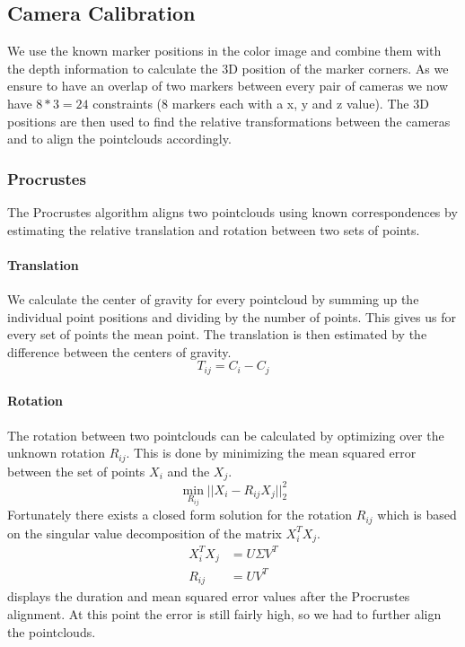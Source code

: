 \documentclass[10pt,twocolumn,letterpaper]{article}
\begin{document}
\subsection{Camera Calibration}
We use the known marker positions in the color image and combine them with the depth information to calculate the 3D position of the marker corners. As we ensure to have an overlap of two markers between every pair of cameras we now have $8*3=24$ constraints (8 markers each with a x, y and z value). The 3D positions are then used to find the relative transformations between the cameras and to align the pointclouds accordingly.
%
\subsubsection{Procrustes}
The Procrustes algorithm aligns two pointclouds using known correspondences by estimating the relative translation and rotation between two sets of points.
\paragraph{Translation}
We calculate the center of gravity for every pointcloud by summing up the individual point positions and dividing by the number of points. This gives us for every set of points the mean point. The translation is then estimated by the difference between the centers of gravity.
\begin{equation}
	T_{ij} = C_i - C_j
\end{equation}
\paragraph{Rotation}
The rotation between two pointclouds can be calculated by optimizing over the unknown rotation $R_{ij}$. This is done by minimizing the mean squared error between the set of points $X_i$ and the $X_j$.
\begin{equation}
	\min_{R_{ij}} || X_i - R_{ij} X_j ||^2_2
\end{equation}
Fortunately there exists a closed form solution for the rotation $R_{ij}$ which is based on the singular value decomposition of the matrix $X_i^T X_j$.
\begin{align}
	X_i^T X_j &= U \Sigma V^T \\
	R_{ij} &= UV^T
\end{align}
 displays the duration and mean squared error values after the Procrustes alignment. At this point the error is still fairly high, so we had to further align the pointclouds.
%
\end{document}
